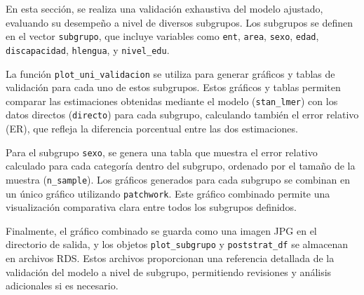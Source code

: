 \documentclass[
  12pt,
]{book}
\begin{document}
En esta sección, se realiza una validación exhaustiva del modelo ajustado, evaluando su desempeño a nivel de diversos subgrupos. Los subgrupos se definen en el vector \texttt{subgrupo}, que incluye variables como \texttt{ent}, \texttt{area}, \texttt{sexo}, \texttt{edad}, \texttt{discapacidad}, \texttt{hlengua}, y \texttt{nivel\_edu}.

La función \texttt{plot\_uni\_validacion} se utiliza para generar gráficos y tablas de validación para cada uno de estos subgrupos. Estos gráficos y tablas permiten comparar las estimaciones obtenidas mediante el modelo (\texttt{stan\_lmer}) con los datos directos (\texttt{directo}) para cada subgrupo, calculando también el error relativo (ER), que refleja la diferencia porcentual entre las dos estimaciones.

Para el subgrupo \texttt{sexo}, se genera una tabla que muestra el error relativo calculado para cada categoría dentro del subgrupo, ordenado por el tamaño de la muestra (\texttt{n\_sample}). Los gráficos generados para cada subgrupo se combinan en un único gráfico utilizando \texttt{patchwork}. Este gráfico combinado permite una visualización comparativa clara entre todos los subgrupos definidos.

Finalmente, el gráfico combinado se guarda como una imagen JPG en el directorio de salida, y los objetos \texttt{plot\_subgrupo} y \texttt{poststrat\_df} se almacenan en archivos RDS. Estos archivos proporcionan una referencia detallada de la validación del modelo a nivel de subgrupo, permitiendo revisiones y análisis adicionales si es necesario.
\end{document}
